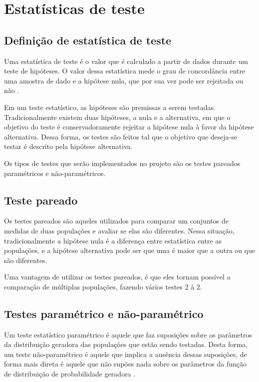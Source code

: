 


\chapter{Estatísticas de teste}
\label{chap:testStatistics}

\section{Definição de estatística de teste}
Uma estatística de teste é o valor que é calculado a partir de dados durante um teste de hipóteses. O valor dessa estatística mede o grau de concordância entre uma amostra de dado e a hipótese nula, que por sua vez pode ser rejeitada ou não \cite{Casella2002}. 

Em um teste estatístico, as hipóteses são premissas a serem testadas. Tradicionalmente existem duas hipóteses, a nula e a alternativa, em que o objetivo do teste é conservadoramente rejeitar a hipótese nula à favor da hipótese alternativa. Dessa forma, os testes são feitos tal que o objetivo que deseja-se testar é descrito pela hipótese alternativa.

Os tipos de testes que serão implementados no projeto são os testes pareados paramétricos e não-paramétricos.

\section{Teste pareado}
Os testes pareados são aqueles utilizados para comparar um conjuntos de medidas de duas populações e avaliar se elas são diferentes. Nessa situação, tradicionalmente a hipótese nula é a diferença entre estatística entre as populações, e a hipótese alternativa pode ser que uma é maior que a outra ou que são diferentes.

Uma vantagem de utilizar os testes pareados, é que eles tornam possível a comparação de múltiplas populações, fazendo vários testes 2 à 2.

\section{Testes paramétrico e não-paramétrico}
Um teste estatístico paramétrico é aquele que faz suposições sobre os parâmetros da
distribuição geradora das populações que estão sendo testadas. Desta forma, um teste
não-paramétrico é aquele que implica a ausência dessas suposições, de forma mais direta é
aquele que não supões nada sobre os parâmetros da função de distribuição de probabilidade
geradora \cite{LowryTrem}.

